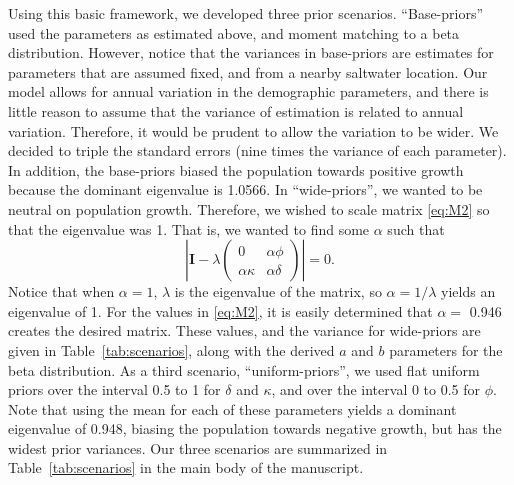 \documentclass[12pt, titlepage]{article}\usepackage[]{graphicx}\usepackage[]{color}
\def\bI{\mathbf{I}}
\begin{document}
Using this basic framework, we developed three prior scenarios.  ``Base-priors'' used the parameters as estimated above, and moment matching to a beta distribution.  However, notice that the variances in base-priors are estimates for parameters that are assumed fixed, and from a nearby saltwater location.  Our model allows for annual variation in the demographic parameters, and there is little reason to assume that the variance of estimation is related to annual variation. Therefore, it would be prudent to allow the variation to be wider.  We decided to triple the standard errors (nine times the variance of each parameter).  In addition, the base-priors biased the population towards positive growth because the dominant eigenvalue is 1.0566.  In ``wide-priors'', we wanted to be neutral on population growth. Therefore, we wished to scale matrix \ref{eq:M2} so that the eigenvalue was 1.  That is, we wanted to find some $\alpha$ such that
\[
  \left| \bI -
  \lambda\left( \begin{array}{ll}
      0 & \alpha\phi \\
      \alpha\kappa & \alpha\delta
  \end{array} \right) \right| = 0.
\]
Notice that when $\alpha = 1$, $\lambda$ is the eigenvalue of the matrix, so $\alpha = 1/\lambda$ yields an eigenvalue of 1. For the values in \ref{eq:M2}, it is easily determined that $\alpha =$ 0.946 creates the desired matrix. These values, and the variance for wide-priors are given in Table~\ref{tab:scenarios}, along with the derived $a$ and $b$ parameters for the beta distribution.  As a third scenario, ``uniform-priors'', we used flat uniform priors over the interval 0.5 to 1 for $\delta$ and $\kappa$, and over the interval 0 to 0.5 for $\phi$.  Note that using the mean for each of these parameters yields a dominant eigenvalue of 0.948, biasing the population towards negative growth, but has the widest prior variances.  Our three scenarios are summarized in Table~\ref{tab:scenarios} in the main body of the manuscript.
\end{document}
